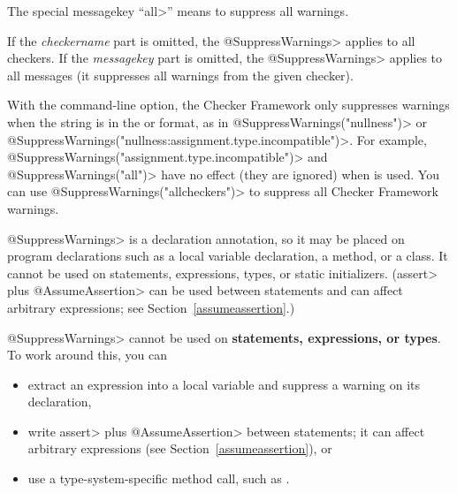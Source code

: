The special messagekey ``\<all>'' means to suppress all warnings.

If the \emph{checkername} part is omitted, the \<@SuppressWarnings> applies
to all checkers.
If the \emph{messagekey} part is omitted, the \<@SuppressWarnings> applies
to all messages (it suppresses all warnings from the given checker).

With the  command-line
option, the Checker Framework only suppresses warnings when the string is in
the  or 
format, as in
\<@SuppressWarnings("nullness")> or
\<@SuppressWarnings("nullness:assignment.type.incompatible")>.
For example, \<@SuppressWarnings("assignment.type.incompatible")> and
\<@SuppressWarnings("all")> have no effect (they are ignored) when
 is used.  You can use
\<@SuppressWarnings("allcheckers")> to suppress all Checker Framework
warnings.

%



\<@SuppressWarnings> is a declaration annotation, so it may be placed on
program declarations such as a local variable declaration, a method, or a
class.  It cannot be used on statements, expressions, types, or static initializers.
(\<assert> plus \<@AssumeAssertion> can be used between statements and can
affect arbitrary expressions; see Section~\ref{assumeassertion}.)

\<@SuppressWarnings> cannot be used on \textbf{statements, expressions, or types}.
To work around this, you can
\begin{itemize}
\item
  extract an expression into a local variable
  and suppress a warning on its declaration,
\item
  write \<assert> plus \<@AssumeAssertion> between statements; it can
  affect arbitrary expressions (see Section~\ref{assumeassertion}), or
\item
  use a type-system-specific method call, such as
  .
\end{itemize}

